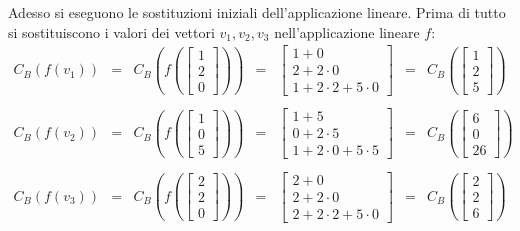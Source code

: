 \documentclass[a4paper]{article}
\begin{document}
	Adesso si eseguono le sostituzioni iniziali dell'applicazione lineare. Prima di tutto si sostituiscono i valori dei vettori $v_{1}, v_{2}, v_{3}$ nell'applicazione lineare $f$:
	\begin{equation*}
		\begin{array}{lllllll}
			C_{B}\left(f\left(v_{1}\right)\right) & = & C_{B}\left(f\left(\begin{bmatrix}
				1 \\
				2 \\
				0
			\end{bmatrix}\right)\right) & = & \begin{bmatrix}
				1 + 0 \\
				2 + 2 \cdot 0 	\\
				1 + 2 \cdot 2 + 5 \cdot 0
			\end{bmatrix} & = & C_{B}\left(\begin{bmatrix}
				1 \\
				2 \\
				5
			\end{bmatrix}\right) \\
			\\
			C_{B}\left(f\left(v_{2}\right)\right) & = & C_{B}\left(f\left(\begin{bmatrix}
				1 \\
				0 \\
				5
			\end{bmatrix}\right)\right) & = & \begin{bmatrix}
				1 + 5 	\\
				0 + 2 \cdot 5 	\\
				1 + 2 \cdot 0 + 5 \cdot 5
			\end{bmatrix} & = & C_{B}\left(\begin{bmatrix}
				6 \\
				0 \\
				26
			\end{bmatrix}\right) \\
			\\
			C_{B}\left(f\left(v_{3}\right)\right) & = & C_{B}\left(f\left(\begin{bmatrix}
				2 \\
				2 \\
				0
			\end{bmatrix}\right)\right) & = & \begin{bmatrix}
				2 + 0 	\\
				2 + 2 \cdot 0 	\\
				2 + 2 \cdot 2 + 5 \cdot 0
			\end{bmatrix} & = & C_{B}\left(\begin{bmatrix}
				2 \\
				2 \\
				6
			\end{bmatrix}\right)
		\end{array}
	\end{equation*}\newpage
	
\end{document}
